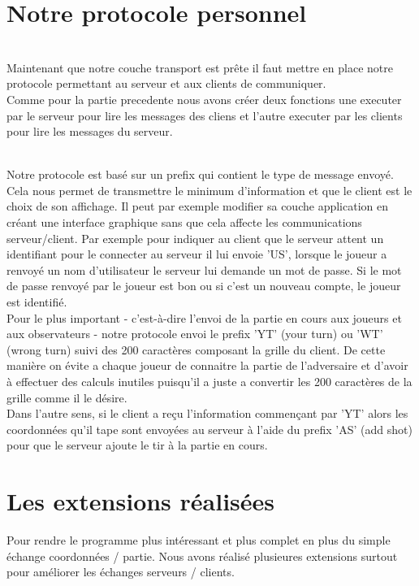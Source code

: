 \documentclass[12pt]{article}
\begin{document}
\section{Notre protocole personnel}
\textnormal{
\\ Maintenant que notre couche transport est prête il faut mettre en place notre protocole permettant au serveur et aux clients de communiquer.\\
Comme pour la partie precedente nous avons créer deux fonctions une executer par le serveur pour lire les messages des cliens et l'autre executer par les clients pour lire les messages du serveur.\\
}

\textnormal{
\\Notre protocole est basé sur un prefix qui contient le type de message envoyé. Cela nous permet de transmettre le minimum d'information et que le client est le choix de son affichage. Il peut par exemple modifier sa couche application en créant une interface graphique sans que cela affecte les communications serveur/client. Par exemple pour indiquer au client que le serveur attent un identifiant pour le connecter au serveur il lui envoie 'US', lorsque le joueur a renvoyé un nom d'utilisateur le serveur lui demande un mot de passe. Si le mot de passe renvoyé par le joueur est bon ou si c'est un nouveau compte, le joueur est identifié.\\
Pour le plus important - c'est-à-dire l'envoi de la partie en cours aux joueurs et aux observateurs - notre protocole envoi le prefix 'YT' (your turn) ou 'WT' (wrong turn) suivi des 200 caractères composant la grille du client. De cette manière on évite a chaque joueur de connaitre la partie de l'adversaire et d'avoir à effectuer des calculs inutiles puisqu'il a juste a convertir les 200 caractères de la grille comme il le désire.\\
Dans l'autre sens, si le client a reçu l'information commençant par 'YT' alors les coordonnées qu'il tape sont envoyées au serveur à l'aide du prefix 'AS' (add shot) pour que le serveur ajoute le tir à la partie en cours.}

\section{Les extensions réalisées}

\textnormal{
Pour rendre le programme plus intéressant et plus complet en plus du simple échange coordonnées / partie. Nous avons réalisé plusieures extensions surtout pour améliorer les échanges serveurs / clients.
}
\end{document}
